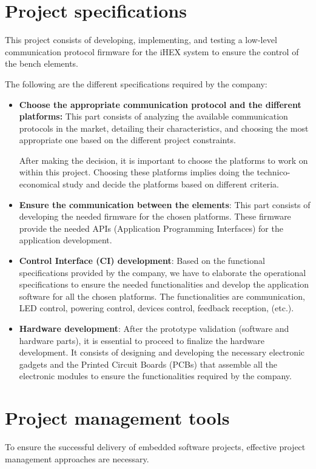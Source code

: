 \section{Project specifications}

This project consists of developing, implementing, and testing a low-level communication protocol firmware for the iHEX system to ensure the control of the bench elements.

The following are the different specifications required by the company:

\begin{itemize}
    \item \textbf{Choose the appropriate communication protocol and the different platforms:}
    This part consists of analyzing the available communication protocols in the market, detailing their characteristics, and choosing the most appropriate one based on the different project constraints.
    
    After making the decision, it is important to choose the platforms to work on within this project. Choosing these platforms implies doing the technico-economical study and decide the platforms based on different criteria.

    \item \textbf{Ensure the communication between the elements}:
    This part consists of developing the needed firmware for the chosen platforms. These firmware provide the needed APIs (Application Programming Interfaces)  for the application development.

    \item \textbf{Control Interface (CI) development}:
    Based on the functional specifications provided by the company, we have to elaborate the operational specifications to ensure the needed functionalities and develop the application software for all the chosen platforms. The functionalities are communication, LED control, powering control, devices control, feedback reception, (etc.).

    \item \textbf{Hardware development}:
    After the prototype validation (software and hardware parts), it is essential to proceed to finalize the hardware development. It consists of designing and developing the necessary electronic gadgets and the Printed Circuit Boards (PCBs) that assemble all the electronic modules to ensure the functionalities required by the company.
\end{itemize}

\section{Project management tools}
To ensure the successful delivery of embedded software projects, effective project management approaches are necessary.

